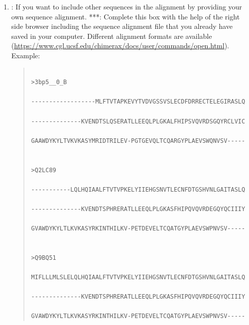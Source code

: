 \begin{itemize}
\begin{itemize}
\begin{itemize}
\begin{itemize}
\begin{enumerate}
                                                \item {}: If you want to include other sequences in the alignment by providing your own sequence alignment. 
                                                    ***: Complete this box with the help of the right side browser including the sequence alignment file that you already have saved in your computer. Different alignment formats are available (\url{https://www.cgl.ucsf.edu/chimerax/docs/user/commands/open.html}).\\
                                                    Example: 
                                                            \begin{quote}
                                                            \begin{verbatim}
                                                                    >3bp5__0_B
                                                                    ------------------MLFTVTAPKEVYTVDVGSSVSLECDFDRRECTELEGIRASLQ
                                                                    --------------KVENDTSLQSERATLLEEQLPLGKALFHIPSVQVRDSGQYRCLVIC
                                                                    GAAWDYKYLTVKVKASYMRIDTRILEV-PGTGEVQLTCQARGYPLAEVSWQNVSV-----
                                                                    
                                                                    >Q2LC89
                                                                    -----------LQLHQIAALFTVTVPKELYIIEHGSNVTLECNFDTGSHVNLGAITASLQ
                                                                    --------------KVENDTSPHRERATLLEEQLPLGKASFHIPQVQVRDEGQYQCIIIY
                                                                    GVAWDYKYLTLKVKASYRKINTHILKV-PETDEVELTCQATGYPLAEVSWPNVSV-----
                                                                    
                                                                    >Q9BQ51
                                                                    MIFLLLMLSLELQLHQIAALFTVTVPKELYIIEHGSNVTLECNFDTGSHVNLGAITASLQ
                                                                    --------------KVENDTSPHRERATLLEEQLPLGKASFHIPQVQVRDEGQYQCIIIY
                                                                    GVAWDYKYLTLKVKASYRKINTHILKV-PETDEVELTCQATGYPLAEVSWPNVSV-----      
                                                            \end{verbatim}
                                                            \end{quote}
                                                \end{enumerate}
                                                    

\end{itemize}
\end{itemize}
\end{itemize}
\end{itemize}
